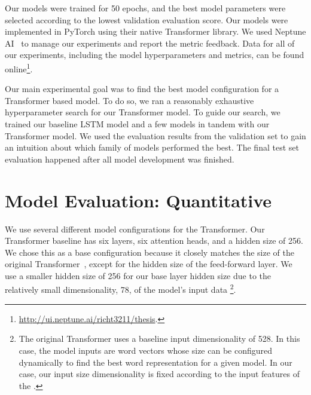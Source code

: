 Our models were trained for 50 epochs, and the best model parameters were selected according to the lowest validation evaluation score. Our models were implemented in PyTorch using their native Transformer library. We used Neptune AI~\cite{neptune} to manage our experiments and report the metric feedback. Data for all of our experiments, including the model hyperparameters and metrics, can be found online\footnote{\url{http://ui.neptune.ai/richt3211/thesis}.}. 

Our main experimental goal was to find the best model configuration for a Transformer based model. To do so, we ran a reasonably exhaustive hyperparameter search for our Transformer model. To guide our search, we trained our baseline LSTM model and a few \vnet{} models in tandem with our Transformer model. We used the evaluation results from the validation set to gain an intuition about which family of models performed the best. The final test set evaluation happened after all model development was finished. 

\section{Model Evaluation: Quantitative}
We use several different model configurations for the Transformer. Our Transformer baseline has six layers, six attention heads, and a hidden size of 256. We chose this as a base configuration because it closely matches the size of the original Transformer~\cite{vaswani2017attention}, except for the hidden size of the feed-forward layer. We use a smaller hidden size of 256 for our base layer hidden size due to the relatively small dimensionality, 78, of the model's input data%
\footnote{The original Transformer uses a baseline input dimensionality of 528. In this case, the model inputs are word vectors whose size can be configured dynamically to find the best word representation for a given model. In our case, our input size dimensionality is fixed according to the input features of the \vnetf{}.}.

